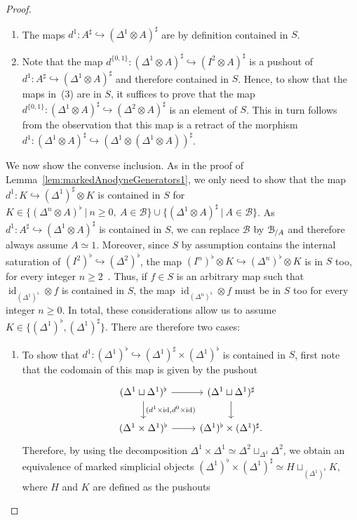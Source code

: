 \documentclass[reqno]{amsart}
\numberwithin{equation}{subsection}
\theoremstyle{plain}
\theoremstyle{definition}
\let\scr=\mathcal
\let\into=\hookrightarrow
\def\BB{\scr B}
\DeclareMathOperator{\id}{id}
\newcommand{\Over}[2]{#1_{\hspace{-1pt}/#2}}
\begin{document}
\begin{proof}
\begin{enumerate}
	\item The maps $d^1\colon A^\sharp\into (\Delta^1\otimes A)^\sharp$ are by definition contained in $S$.
	\item Note that the map $d^{\{0,1\}}\colon (\Delta^1\otimes A)^\sharp\into (I^2\otimes A)^\sharp$ is a pushout of $d^1\colon A^\sharp\into(\Delta^1\otimes A)^\sharp$ and therefore contained in $S$. Hence, to show that the maps in~(3) are in $S$, it suffices to prove that the map $d^{\{0,1\}}\colon (\Delta^1\otimes A)^\sharp\into(\Delta^2\otimes A)^\sharp$ is an element of $S$. This in turn follows from the observation that this map is a retract of the morphism $d^1\colon (\Delta^1\otimes A)^\sharp\into(\Delta^1\otimes(\Delta^1\otimes A))^\sharp$.
	\end{enumerate}
	We now show the converse inclusion. As in the proof of Lemma~\ref{lem:markedAnodyneGenerators1}, we only need to show that the map $d^1\colon K\into (\Delta^1)^\sharp\otimes K$ is contained in $S$ for $K\in\{(\Delta^n\otimes A)^\flat~\vert~ n\geq 0,~A\in\BB\}\cup\{(\Delta^1\otimes A)^\sharp~\vert~A\in\BB\}$. As $d^1\colon A^\sharp\into(\Delta^1\otimes A)^\sharp$ is contained in $S$, we can replace $\BB$ by $\Over{\BB}{A}$ and therefore always assume $A\simeq 1$. Moreover, since $S$ by assumption contains the internal saturation of $(I^2)^\flat\into(\Delta^2)^\flat$, the map $(I^n)^\flat\otimes K\into (\Delta^n)^\flat\otimes K$ is in $S$ too, for every integer $n\geq 2$~\cite[Lemma~3.2.5]{Martini2021}. Thus, if $f\in S$ is an arbitrary map such that $\id_{(\Delta^1)^\flat}\otimes f$ is contained in $S$, the map $\id_{(\Delta^n)^\flat}\otimes f$ must be in $S$ too for every integer $n\geq 0$. In total, these considerations allow us to assume $K\in\{(\Delta^1)^\flat,(\Delta^1)^\sharp\}$. There are therefore two cases:
	\begin{enumerate}
		\item To show that $d^1\colon (\Delta^1)^\flat\into(\Delta^1)^\sharp\times(\Delta^1)^\flat$ is contained in $S$, first note that the codomain of this map is given by the pushout
		\begin{equation*}
		\begin{tikzcd}
		(\Delta^1\sqcup\Delta^1)^\flat\arrow[r]\arrow[d, "{(d^1\times\id, d^0\times\id)}"] & (\Delta^1\sqcup\Delta^1)^\sharp\arrow[d]\\
		(\Delta^1\times\Delta^1)^\flat\arrow[r] & (\Delta^1)^\flat\times(\Delta^1)^\sharp.
		\end{tikzcd}
		\end{equation*}
		Therefore, by using the decomposition $\Delta^1\times\Delta^1\simeq\Delta^2\sqcup_{\Delta^1}\Delta^2$, we obtain an equivalence of marked simplicial objects $(\Delta^1)^\flat \times(\Delta^1)^\sharp\simeq H\sqcup_{(\Delta^1)^\flat}K$, where $H$ and $K$ are defined as the pushouts

\end{enumerate}
\end{proof}
\end{document}
